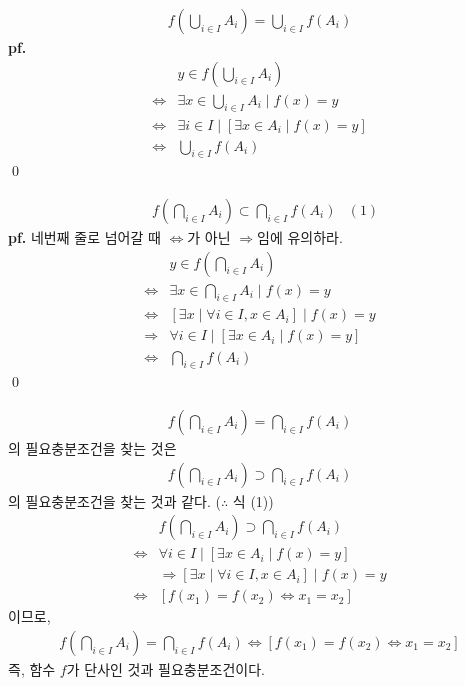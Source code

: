\documentclass{article}
\begin{document}
\begin{align*}f\left(\bigcup_{i \in I} A_i\right) = \bigcup_{i \in I} f(A_i)\end{align*}
\textbf{pf.}
\begin{align*}
&y \in f\left(\bigcup_{i \in I} A_i\right)
\\ \iff& \exists x \in \bigcup_{i \in I} A_i \mid f(x) = y
\\ \iff& \exists i \in I \mid \left[\exists x \in A_i \mid f(x) = y\right]
\\ \iff& \bigcup_{i \in I} f(A_i)
\end{align*} \qed

\begin{align*}&f\left(\bigcap_{i \in I} A_i\right) \subset \bigcap_{i \in I} f(A_i) &(1)\end{align*}
\textbf{pf.} 네번째 줄로 넘어갈 때 $\iff$가 아닌 $\Rightarrow$임에 유의하라.
\begin{align*}
&y \in f\left(\bigcap_{i \in I} A_i\right)
\\ \iff& \exists x \in \bigcap_{i \in I} A_i \mid f(x) = y
\\ \iff& \left[\exists x \mid \forall i\in I, x \in A_i  \right] \mid  f(x) = y 
\\ \Rightarrow& \forall i \in I \mid \left[\exists x \in A_i \mid f(x) = y\right]
\\ \iff& \bigcap_{i \in I} f(A_i)
\end{align*} \qed

\begin{align*}f\left(\bigcap_{i \in I} A_i\right) = \bigcap_{i \in I} f(A_i)\end{align*}
의 필요충분조건을 찾는 것은
\begin{align*}f\left(\bigcap_{i \in I} A_i\right) \supset \bigcap_{i \in I} f(A_i)\end{align*}
의 필요충분조건을 찾는 것과 같다. ($\therefore$ 식 (1))
\begin{align*}
&f\left(\bigcap_{i \in I} A_i\right) \supset \bigcap_{i \in I} f(A_i)
\\ \iff & \forall i \in I \mid \left[\exists x \in A_i \mid f(x) = y\right] 
\\ &\Rightarrow \left[\exists x \mid \forall i\in I, x \in A_i  \right] \mid  f(x) = y  
\\ \iff & \left[ f(x_1) = f(x_2) \iff x_1 = x_2 \right]
\end{align*}
이므로, 
\begin{align*}
f\left(\bigcap_{i \in I} A_i\right) = \bigcap_{i \in I} f(A_i) \iff \left[ f(x_1) = f(x_2) \iff x_1 = x_2 \right]
\end{align*}
즉, 함수 $f$가 단사인 것과 필요충분조건이다.
\end{document}
